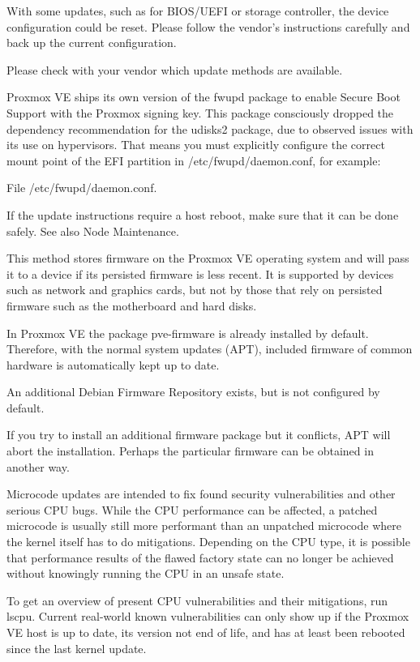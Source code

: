 With some updates, such as for BIOS/UEFI or storage controller, the device configuration could be reset. Please follow the vendor’s instructions carefully and back up the current configuration.

Please check with your vendor which update methods are available.

Proxmox VE ships its own version of the fwupd package to enable Secure Boot Support with the Proxmox signing key. This package consciously dropped the dependency recommendation for the udisks2 package, due to observed issues with its use on hypervisors. That means you must explicitly configure the correct mount point of the EFI partition in /etc/fwupd/daemon.conf, for example:

File /etc/fwupd/daemon.conf.

If the update instructions require a host reboot, make sure that it can be done safely. See also Node Maintenance.

This method stores firmware on the Proxmox VE operating system and will pass it to a device if its persisted firmware is less recent. It is supported by devices such as network and graphics cards, but not by those that rely on persisted firmware such as the motherboard and hard disks.

In Proxmox VE the package pve-firmware is already installed by default. Therefore, with the normal system updates (APT), included firmware of common hardware is automatically kept up to date.

An additional Debian Firmware Repository exists, but is not configured by default.

If you try to install an additional firmware package but it conflicts, APT will abort the installation. Perhaps the particular firmware can be obtained in another way.

Microcode updates are intended to fix found security vulnerabilities and other serious CPU bugs. While the CPU performance can be affected, a patched microcode is usually still more performant than an unpatched microcode where the kernel itself has to do mitigations. Depending on the CPU type, it is possible that performance results of the flawed factory state can no longer be achieved without knowingly running the CPU in an unsafe state.

To get an overview of present CPU vulnerabilities and their mitigations, run lscpu. Current real-world known vulnerabilities can only show up if the Proxmox VE host is up to date, its version not end of life, and has at least been rebooted since the last kernel update.

